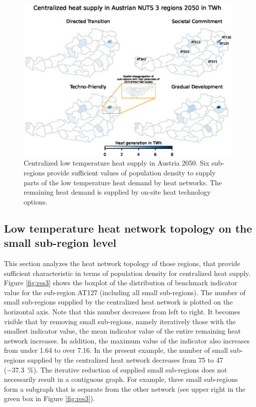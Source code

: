 \begin{figure}
	\centering
	\includegraphics[width=1\linewidth]{figures/4_Results/Heatmap.eps}
	\caption{Centralized low temperature heat supply in Austria 2050. Six sub-regions provide sufficient values of population density to supply parts of the low temperature heat demand by heat networks. The remaining heat demand is supplied by on-site heat technology options. }
	\label{fig:res2}
\end{figure}

\newpage
\subsection{Low temperature heat network topology on the small sub-region level}\label{res:4}
This section analyzes the heat network topology of those regions, that provide sufficient characteristic in terms of population density for centralized heat supply. Figure \ref{fig:res3} shows the boxplot of the distribution of benchmark indicator value for the sub-region AT127 (including all small sub-regions). The number of small sub-regions supplied by the centralized heat network is plotted on the horizontal axis. Note that this number decreases from left to right. It becomes visible that by removing small sub-regions, namely iteratively those with the smallest indicator value, the mean indicator value of the entire remaining heat network increases. In addition, the maximum value of the indicator also increases from under 1.64 to over 7.16. In the present example, the number of small sub-regions supplied by the centralized heat network decreases from \SI{75}{} to \SI{47}{} (\SI{-37.3}{\%}). The iterative reduction of supplied small sub-regions does not necessarily result in a contiguous graph. For example, three small sub-regions form a subgraph that is separate from the other network (see upper right in the green box in Figure \ref{fig:res3}).\newline

